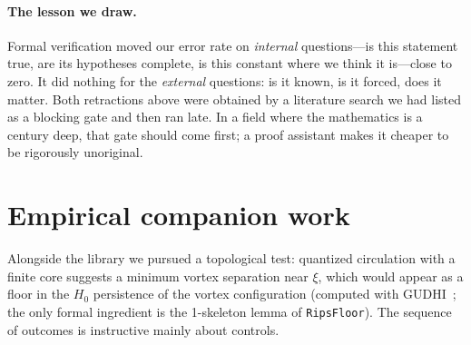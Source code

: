 \documentclass[11pt,a4paper]{article}
\theoremstyle{definition}
\newcommand{\lean}[1]{\texttt{\small #1}}
\begin{document}
\paragraph{The lesson we draw.} Formal verification moved our error rate on
\emph{internal} questions---is this statement true, are its hypotheses complete, is this
constant where we think it is---close to zero. It did nothing for the \emph{external}
questions: is it known, is it forced, does it matter. Both retractions above were obtained
by a literature search we had listed as a blocking gate and then ran late. In a field where
the mathematics is a century deep, that gate should come first; a proof assistant makes it
cheaper to be rigorously unoriginal.

\section{Empirical companion work}
\label{sec:empirical}

Alongside the library we pursued a topological test: quantized circulation with a finite
core suggests a minimum vortex separation near $\xi$, which would appear as a floor in the
$H_0$ persistence of the vortex configuration (computed with GUDHI~\cite{GUDHI}; the only
formal ingredient is the 1-skeleton lemma of \lean{RipsFloor}). The sequence of outcomes is
instructive mainly about controls.
\end{document}

